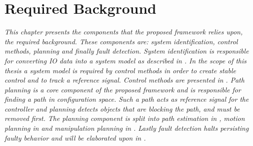 \chapter{Required Background}%
\label{chap:required_background}
\textit{This chapter presents the components that the proposed framework relies upon, the required background. These components are: system identification, control methods, planning and finally fault detection. System identification is responsible for converting \ac{IO} data into a system model as described in . In the scope of this thesis a system model is required by control methods in order to create stable control and to track a reference signal. Control methods are presented in . Path planning is a core component of the proposed framework and is responsible for finding a path in configuration space. Such a path acts as reference signal for the controller and planning detects objects that are blocking the path, and must be removed first. The planning component is split into path estimation in , motion planning in  and manipulation planning in . Lastly fault detection halts persisting faulty behavior and will be elaborated upon in .\bs}

% 




